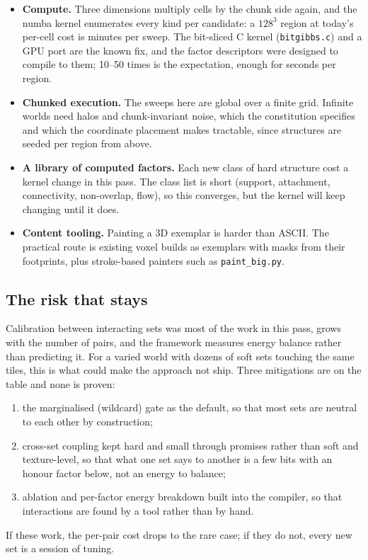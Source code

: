 \documentclass[11pt]{article}
\newcommand{\1}{\mathds{1}}
\newcommand{\code}[1]{\texttt{#1}}
\begin{document}
\begin{itemize}
\item \textbf{Compute.} Three dimensions multiply cells by the chunk side
  again, and the numba kernel enumerates every kind per candidate: a
  $128^3$ region at today's per-cell cost is minutes per sweep. The
  bit-sliced C kernel (\code{bitgibbs.c}) and a GPU port are the known fix,
  and the factor descriptors were designed to compile to them; 10--50
  times is the expectation, enough for seconds per region.
\item \textbf{Chunked execution.} The sweeps here are global over a finite
  grid. Infinite worlds need halos and chunk-invariant noise, which the
  constitution specifies and which the coordinate placement makes
  tractable, since structures are seeded per region from above.
\item \textbf{A library of computed factors.} Each new class of hard
  structure cost a kernel change in this pass. The class list is short
  (support, attachment, connectivity, non-overlap, flow), so this
  converges, but the kernel will keep changing until it does.
\item \textbf{Content tooling.} Painting a 3D exemplar is harder than
  ASCII. The practical route is existing voxel builds as exemplars with
  masks from their footprints, plus stroke-based painters such as
  \code{paint\_big.py}.
\end{itemize}

\subsection{The risk that stays}

Calibration between interacting sets was most of the work in this pass,
grows with the number of pairs, and the framework measures energy balance
rather than predicting it. For a varied world with dozens of soft sets
touching the same tiles, this is what could make the approach not ship.
Three mitigations are on the table and none is proven:
\begin{enumerate}
\item the marginalised (wildcard) gate as the default, so that most sets
  are neutral to each other by construction;
\item cross-set coupling kept hard and small through promises rather than
  soft and texture-level, so that what one set says to another is a few
  bits with an honour factor below, not an energy to balance;
\item ablation and per-factor energy breakdown built into the compiler, so
  that interactions are found by a tool rather than by hand.
\end{enumerate}
If these work, the per-pair cost drops to the rare case; if they do not,
every new set is a session of tuning.
\end{document}
